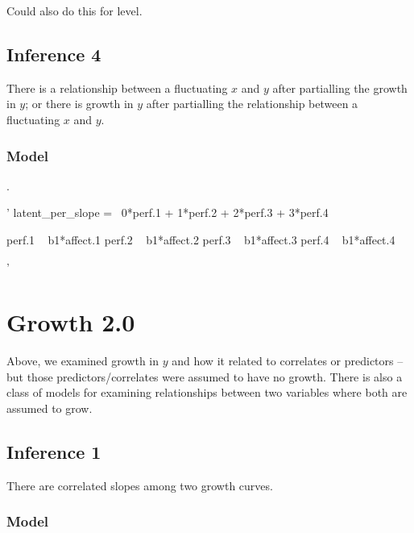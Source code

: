 \documentclass[english,,man]{apa6}
\newenvironment{Shaded}{\begin{snugshade}}{\end{snugshade}}
\newcommand{\StringTok}[1]{\textcolor[rgb]{0.31,0.60,0.02}{#1}}
\theoremstyle{definition}
\theoremstyle{definition}
\theoremstyle{definition}
\theoremstyle{remark}
\begin{document}
\noindent Could also do this for level.

\hypertarget{inference-4}{%
\subsection{Inference 4}\label{inference-4}}

There is a relationship between a fluctuating \(x\) and \(y\) after
partialling the growth in \(y\); or there is growth in \(y\) after
partialling the relationship between a fluctuating \(x\) and \(y\).

\hypertarget{model-5}{%
\subsubsection{Model}\label{model-5}}

.

\begin{Shaded}
\begin{Highlighting}[]
\StringTok{'}
\StringTok{latent_per_slope =~ 0*perf.1 + 1*perf.2 + 2*perf.3 + 3*perf.4}

\StringTok{perf.1 ~ b1*affect.1}
\StringTok{perf.2 ~ b1*affect.2}
\StringTok{perf.3 ~ b1*affect.3}
\StringTok{perf.4 ~ b1*affect.4}

\StringTok{'}
\end{Highlighting}
\end{Shaded}

\hypertarget{growth-2.0}{%
\section{Growth 2.0}\label{growth-2.0}}

Above, we examined growth in \(y\) and how it related to correlates or
predictors -- but those predictors/correlates were assumed to have no
growth. There is also a class of models for examining relationships
between two variables where both are assumed to grow.

\hypertarget{inference-1-2}{%
\subsection{Inference 1}\label{inference-1-2}}

There are correlated slopes among two growth curves.

\hypertarget{model-6}{%
\subsubsection{Model}\label{model-6}}
\end{document}
